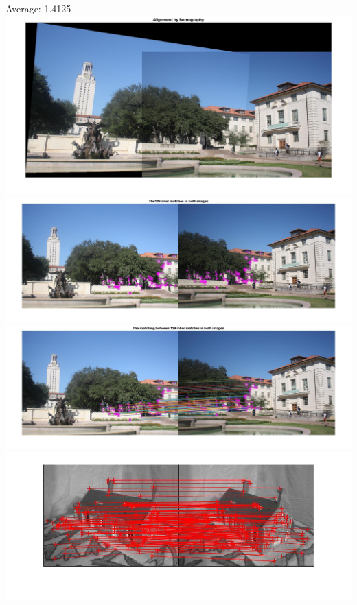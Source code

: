 \documentclass[a4paper,11pt]{article}
\begin{document}
Average: 1.4125\\
\includegraphics[width=\textwidth]{hw3/code/5}\\
\includegraphics[width=\textwidth]{hw3/code/6}\\
\includegraphics[width=\textwidth]{hw3/code/7}\\
\includegraphics[width=\textwidth]{hw3/data/part2/1}\\
\end{document}
